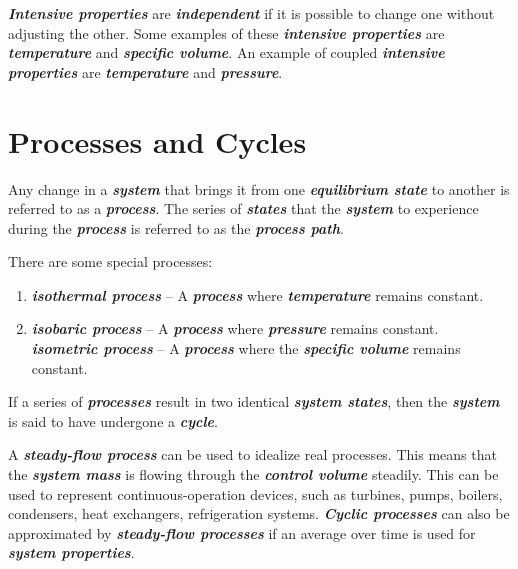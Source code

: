 \textbf{\textit{Intensive properties}} are \textbf{\textit{independent}} if it is possible to change one without adjusting the other. Some examples of these \textbf{\textit{intensive properties}} are \textbf{\textit{temperature}} and \textbf{\textit{specific volume}}. An example of coupled \textbf{\textit{intensive properties}} are \textbf{\textit{temperature}} and \textbf{\textit{pressure}}.

\section{Processes and Cycles}
Any change in a \textbf{\textit{system}} that brings it from one \textbf{\textit{equilibrium state}} to another is referred to as a \textbf{\textit{process}}. The series of \textbf{\textit{states}} that the \textbf{\textit{system}} to experience during the \textbf{\textit{process}} is referred to as the \textbf{\textit{process path}}.

There are some special processes:
%
\begin{enumerate}
\item \textbf{\textit{isothermal process}} -- A \textbf{\textit{process}} where \textbf{\textit{temperature}} remains constant.\\
\item \textbf{\textit{isobaric process}} -- A \textbf{\textit{process}} where \textbf{\textit{pressure}} remains constant.\\
\textbf{\textit{isometric process}} -- A \textbf{\textit{process}} where the \textbf{\textit{specific volume}} remains constant.
\end{enumerate}
%

If a series of \textbf{\textit{processes}} result in two identical \textbf{\textit{system states}}, then the \textbf{\textit{system}} is said to have undergone a \textbf{\textit{cycle}}.

A \textbf{\textit{steady-flow process}} can be used to idealize real processes. This means that the \textbf{\textit{system mass}} is flowing through the \textbf{\textit{control volume}} steadily. This can be used to represent continuous-operation devices, such as turbines, pumps, boilers, condensers, heat exchangers, refrigeration systems. \textbf{\textit{Cyclic processes}} can also be approximated by \textbf{\textit{steady-flow processes}} if an average over time is used for \textbf{\textit{system properties}}.

